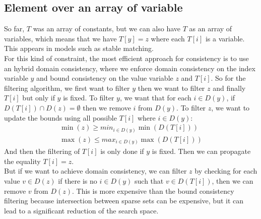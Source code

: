\documentclass[12pt, openany]{report}
\theoremstyle{definition}
\begin{document}
\subsection{Element over an array of variable}
So far, $T$ was an array of constants, but we can also have $T$ as an array of variables, which means that we have $T[y] = z$ where each $T[i]$ is a variable. This appears in models such as stable matching.\\
For this kind of constraint, the most efficient approach for consistency is to use an hybrid domain consistency, where we enforce domain consistency on the index variable $y$ and bound consistency on the value variable $z$ and $T[i]$. So for the filtering algorithm, we first want to filter $y$ then we want to filter $z$ and finally $T[i]$ but only if $y$ is fixed. To filter $y$, we want that for each $i \in D(y)$, if $D(T[i]) \cap D(z) = \emptyset$ then we remove $i$ from $D(y)$. To filter $z$, we want to update the bounds using all possible $T[i]$ where $i \in D(y)$:
\begin{equation}
    \begin{aligned}
        \min(z) \geq min_{i \in D(y)} \min(D(T[i]))\\
        \max(z) \leq max_{i \in D(y)} \max(D(T[i]))
    \end{aligned}
\end{equation}
And then the filtering of $T[i]$ is only done if $y$ is fixed. Then we can propagate the equality $T[i]=z$.\\
But if we want to achieve domain consistency, we can filter $z$ by checking for each value $v \in D(z)$ if there is no $i \in D(y)$ such that $v \in D(T[i])$, then we can remove $v$ from $D(z)$. This is more expensive than the bound consistency filtering because intersection between sparse sets can be expensive, but it can lead to a significant reduction of the search space. 
\end{document}
